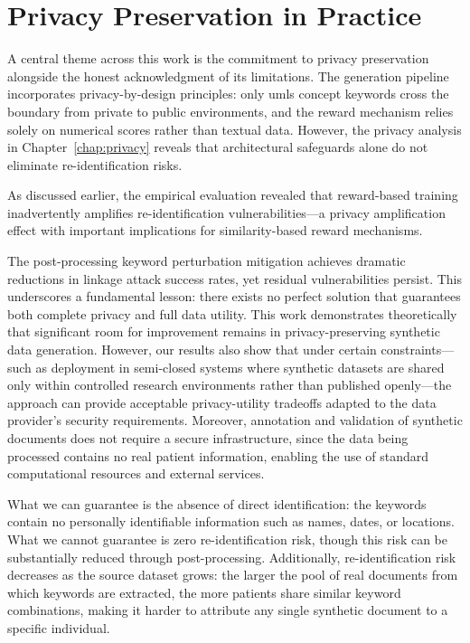 \section{Privacy Preservation in Practice}
A central theme across this work is the commitment to privacy preservation alongside the honest acknowledgment of its limitations.
The generation pipeline incorporates privacy-by-design principles: only \gls{umls} concept keywords cross the boundary from private to public environments, and the reward mechanism relies solely on numerical scores rather than textual data.
However, the privacy analysis in Chapter~\ref{chap:privacy} reveals that architectural safeguards alone do not eliminate re-identification risks.

As discussed earlier, the empirical evaluation revealed that reward-based training inadvertently amplifies re-identification vulnerabilities—a privacy amplification effect with important implications for similarity-based reward mechanisms.

The post-processing keyword perturbation mitigation achieves dramatic reductions in linkage attack success rates, yet residual vulnerabilities persist.
This underscores a fundamental lesson: there exists no perfect solution that guarantees both complete privacy and full data utility.
This work demonstrates theoretically that significant room for improvement remains in privacy-preserving synthetic data generation.
However, our results also show that under certain constraints—such as deployment in semi-closed systems where synthetic datasets are shared only within controlled research environments rather than published openly—the approach can provide acceptable privacy-utility tradeoffs adapted to the data provider's security requirements.
Moreover, annotation and validation of synthetic documents does not require a secure infrastructure, since the data being processed contains no real patient information, enabling the use of standard computational resources and external services.

What we can guarantee is the absence of direct identification: the keywords contain no personally identifiable information such as names, dates, or locations.
What we cannot guarantee is zero re-identification risk, though this risk can be substantially reduced through post-processing.
Additionally, re-identification risk decreases as the source dataset grows: the larger the pool of real documents from which keywords are extracted, the more patients share similar keyword combinations, making it harder to attribute any single synthetic document to a specific individual.

